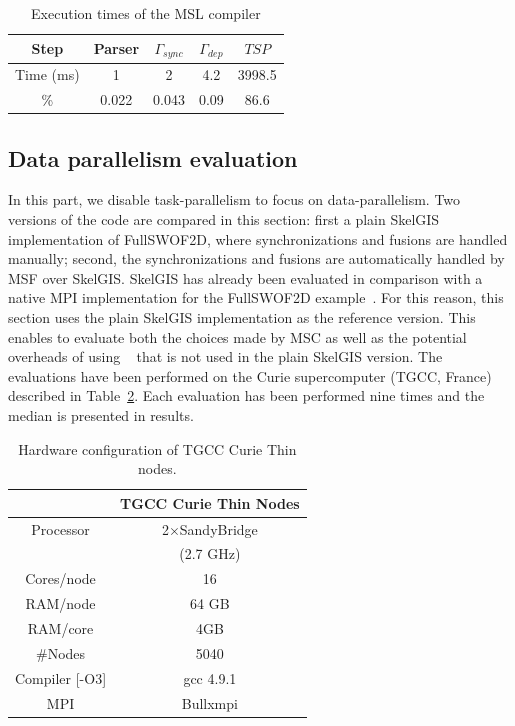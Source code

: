 \begin{table}[!h]
 \begin{center}
 \begin{tabular}{|c|c|c|c|c|}
   Step & Parser & $\Gamma_{sync}$ & $\Gamma_{dep}$ & $TSP$\\
   \hline
   Time (ms) & 1 & 2 & 4.2 & 3998.5\\
   \% & 0.022 & 0.043 & 0.09 & 86.6\\
 \end{tabular}
\caption{Execution times of the MSL compiler}
\label{fig:exectime}
 \end{center}
\end{table}

\subsection{Data parallelism evaluation}

In this part, we disable task-parallelism to focus on data-parallelism. Two versions of the code are compared in this section: first a plain SkelGIS implementation of FullSWOF2D, where synchronizations and fusions are handled manually; second, the synchronizations and fusions are automatically handled by MSF over SkelGIS. SkelGIS has already been evaluated in comparison with a native MPI implementation for the FullSWOF2D example~\cite{CPE:CPE3494}. For this reason, this section uses the plain SkelGIS implementation as the reference version. This enables to evaluate both the choices made by MSC as well as the potential overheads of using \llc~\cite{l2c} that is not used in the plain SkelGIS version. The evaluations have been performed on the Curie supercomputer (TGCC, France) described in Table~\ref{tab:TGCC}. Each evaluation has been performed nine times and the median is presented in results.

\begin{table}[!ht]
\begin{center}
 \begin{tabular}{|c|c|}
     & TGCC Curie Thin Nodes\\
     \hline         
    Processor & 2$\times$SandyBridge\\
    & (2.7 GHz)\\
    Cores/node & 16 \\
    RAM/node & 64 GB\\
    RAM/core & 4GB\\
    \#Nodes & 5040 \\
    Compiler [-O3] & gcc 4.9.1\\
    MPI & Bullxmpi\\
 \end{tabular}
 \caption{\label{tab:TGCC}Hardware configuration of TGCC Curie Thin nodes.}
 \end{center}
\end{table}

